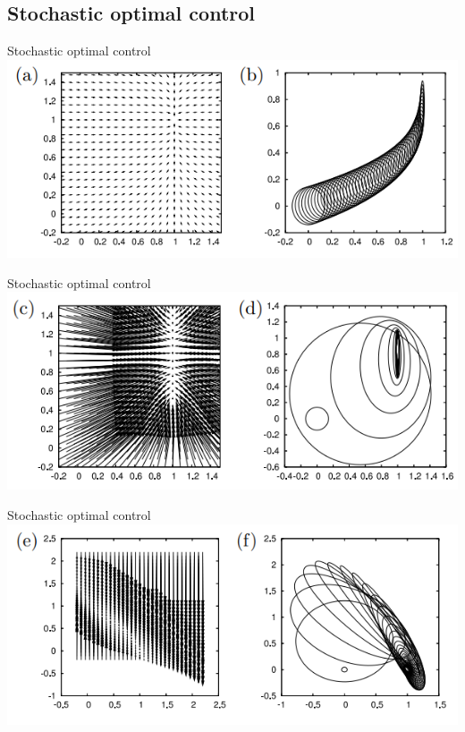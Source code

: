 \documentclass[handout]{beamer}
\theoremstyle{definition}
\begin{document}
\subsection{Stochastic optimal control}
\begin{frame}{Stochastic optimal control}
    \includegraphics[width=\textwidth]{figs/fig_4ab_control_example.png}
\end{frame}


\begin{frame}{Stochastic optimal control}
    \includegraphics[width=\textwidth]{figs/fig_4cd_control_example.png}
\end{frame}


\begin{frame}{Stochastic optimal control}
    \includegraphics[width=\textwidth]{figs/fig_4ef_control_example.png}
\end{frame}
\end{document}
